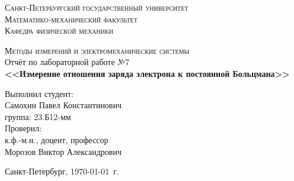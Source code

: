 \begin{titlepage}
\begin{center}
\textsc{Санкт-Петербургский государственный университет\\
Математико-механический факультет\\
Кафедра физической механики\\}

\vfill

\textsc{Методы измерений и электромеханические системы\\[3mm]}
Отчёт по лабораторной работе №7\\[6mm]


\textbf{\large<<Измерение отношения заряда электрона к постоянной Больцмана>>}

\vfill
\end{center}

\hfill
\begin{minipage}{.5\textwidth}
Выполнил студент:\\[2mm] 
Самохин Павел Константинович\\
группа: 23.Б12-мм\\[5mm]

Проверил:\\[2mm] 
к.ф.-м.н., доцент, профессор\\
Морозов Виктор Александрович
\end{minipage}%
\vfill
\begin{center}
 Санкт-Петербург, \yeardate\today\ г.
\end{center}
\end{titlepage}